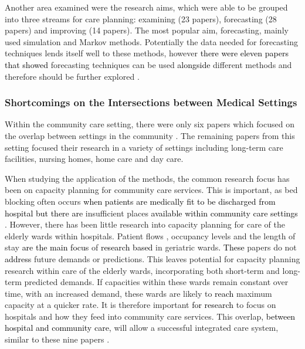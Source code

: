 \documentclass[../thesis.tex]{subfiles}
\begin{document}
Another area examined were the research aims, which were able to be grouped into three streams for care planning\textcolor{black}{:} examining (23 papers), forecasting (28 papers) and improving (14 papers).
The most popular aim, forecasting, mainly used simulation and Markov methods. Potentially the data needed for forecasting techniques lends itself well to these methods, however \textcolor{black}{there were eleven papers that showed} forecasting techniques can be used \textcolor{black}{alongside} different methods and therefore should be further explored \cite{Abe,Arling,Borowiak, Davari,Desai, Grenouilleau, Gorunescu, Johnson,Lim, Bidhandi,Yalcindag}.
 
\subsubsection{Shortcomings on the Intersections between Medical Settings}

Within the community care setting, there were only six papers which focused on the overlap between settings in the community \cite{Bae, Gassoumis, YLi,Bidhandi,Welberry, Zhang1}. The remaining papers from this setting focused their research in a variety of settings including long-term care facilities, nursing homes, home care and day care.

When studying the application of the methods, the common research focus has been on capacity planning for community care services. This is important, as bed blocking often occurs \textcolor{black}{when patients are medically fit to be discharged from hospital but there are} insufficient places \textcolor{black}{available within community care settings} \cite{Katsaliaki}. However, there has been little research into capacity planning for care of the elderly wards within hospitals. Patient flows \cite{Chaussalet}, occupancy levels \cite{Christodoulou} and the length of stay \cite{Marshall3} \textcolor{black}{are the main focus }of \textcolor{black}{research based} in geriatric wards\textcolor{black}{.} \textcolor{black}{These} papers do not \textcolor{black}{address} future demands or predictions. This leaves potential for capacity planning research within care of the elderly wards, incorporating both short-term and long-term predicted demands. If capacities within these wards remain constant over time, with an increased demand, these wards are likely to \textcolor{black}{reach} maximum capacity at a quicker rate. It is therefore important \textcolor{black}{for research} to focus on hospitals and how they feed into community care services. This overlap\textcolor{black}{, between hospital and community care,} will allow a successful integrated care system, similar to these nine papers \cite{Davari, Intrevado, Johnson,Lim, McClean,Patrick,Ragab, Walker,Zychlinski}.
\end{document}
